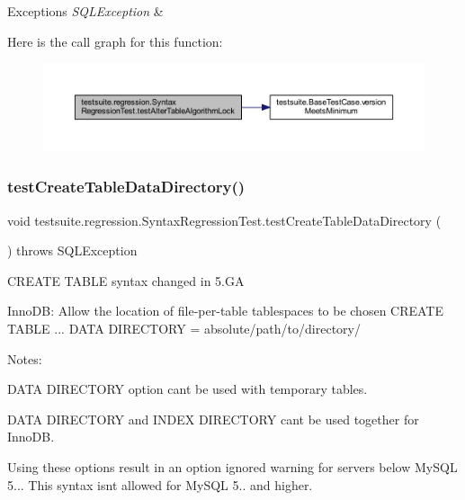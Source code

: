\begin{DoxyExceptions}{Exceptions}
{\em S\+Q\+L\+Exception} & \\
\hline
\end{DoxyExceptions}
Here is the call graph for this function\+:
\nopagebreak
\begin{figure}[H]
\begin{center}
\leavevmode
\includegraphics[width=350pt]{classtestsuite_1_1regression_1_1_syntax_regression_test_ad8db7c4293c435d564218db929d2d30d_cgraph}
\end{center}
\end{figure}
\mbox{\label{classtestsuite_1_1regression_1_1_syntax_regression_test_a5e613256d2f2d7d6fbd6144c8b050670}} 
\subsubsection{\texorpdfstring{test\+Create\+Table\+Data\+Directory()}{testCreateTableDataDirectory()}}
{\footnotesize\ttfamily void testsuite.\+regression.\+Syntax\+Regression\+Test.\+test\+Create\+Table\+Data\+Directory (\begin{DoxyParamCaption}{ }\end{DoxyParamCaption}) throws S\+Q\+L\+Exception}

C\+R\+E\+A\+TE T\+A\+B\+LE syntax changed in 5.\+GA

Inno\+DB\+: Allow the location of file-\/per-\/table tablespaces to be chosen C\+R\+E\+A\+TE T\+A\+B\+LE ... D\+A\+TA D\+I\+R\+E\+C\+T\+O\+RY = \textquotesingle{}absolute/path/to/directory/\textquotesingle{}

Notes\+:
\begin{DoxyItemize}
\item D\+A\+TA D\+I\+R\+E\+C\+T\+O\+RY option can\textquotesingle{}t be used with temporary tables.
\item D\+A\+TA D\+I\+R\+E\+C\+T\+O\+RY and I\+N\+D\+EX D\+I\+R\+E\+C\+T\+O\+RY can\textquotesingle{}t be used together for Inno\+DB.
\item Using these options result in an \textquotesingle{}option ignored\textquotesingle{} warning for servers below My\+S\+QL 5... This syntax isn\textquotesingle{}t allowed for My\+S\+QL 5.. and higher.
\end{DoxyItemize}


